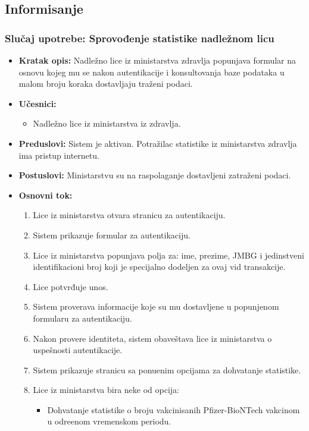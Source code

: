\documentclass[titlepage]{article}
\begin{document}
\subsection{Informisanje}
\subsubsection{Slučaj upotrebe: Sprovođenje statistike nadle\v{z}nom licu}
\begin{itemize}
\item \textbf{Kratak opis:}  Nadle\v{z}no lice iz ministarstva zdravlja popunjava formular na osnovu kojeg mu se nakon autentikacije i konsultovanja baze podataka u malom broju koraka dostavljaju tra\v{z}eni podaci.
\item \textbf{Učesnici:}
\begin{itemize}
    \item Nadle\v{z}no lice iz ministarstva iz zdravlja.
\end{itemize}
 \item \textbf{Preduslovi:} Sistem je aktivan. Potra\v{z}ilac statistike iz ministarstva zdravlja ima pristup internetu.
 \item \textbf{Postuslovi:} Ministarstvu su na raspolaganje dostavljeni zatra\v{z}eni podaci.
 \item \textbf{Osnovni tok:}
 \begin{enumerate}
    \item Lice iz ministarstva otvara stranicu za autentikaciju.
    \item Sistem prikazuje formular za autentikaciju.
    \item Lice iz ministarstva popunjava polja za: ime, prezime, JMBG i jedinstveni identifikacioni broj koji je specijalno dodeljen za ovaj vid transakcije.
    \item Lice potvrđuje unos.
    \item Sistem proverava informacije koje su mu dostavljene u popunjenom formularu za autentikaciju.
    \item Nakon provere identiteta, sistem obave\v{s}tava lice iz ministarstva o uspe\v{s}nosti autentikacije.
    \item Sistem prikazuje stranicu sa ponu\dj{}enim opcijama za dohvatanje statistike.
    \item Lice iz ministarstva bira neke od opcija:
    \begin{itemize}
                    \item Dohvatanje statistike o broju vakcinisanih Pfizer-BioNTech vakcinom u odre\dj{}enom vremenskom periodu.

\end{itemize}
\end{enumerate}
\end{itemize}
\end{document}
